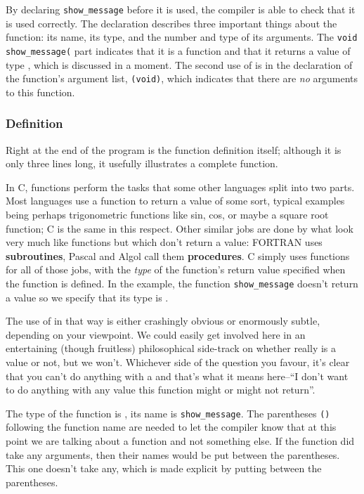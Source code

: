     By declaring \texttt{show\_message} before it is used, the compiler
     is able to check that it is used correctly. The declaration describes
     three important things about the function: its name, its type, and the
     number and type of its arguments. The \texttt{void show\_message(} part
     indicates that it is a function and that it returns a value of type
     \void, which is discussed in a moment. The second use of
     \void{} is in the declaration of the function's argument list,
     \texttt{(void)}, which indicates that there are \textit{no} arguments
     to this function.


   

   \subsubsection{Definition}
    

    Right at the end of the program is the function definition itself;
     although it is only three lines long, it usefully illustrates a complete
     function.


    In C, functions perform the tasks that some other languages split into
     two parts. Most languages use a function to return a value of some sort,
     typical examples being perhaps trigonometric functions like sin, cos, or
     maybe a square root function; C is the same in this respect. Other similar
     jobs are done by what look very much like functions but which don't return
     a value: FORTRAN uses \textbf{subroutines}, Pascal and Algol call them
     \textbf{procedures}. C simply uses functions for all of those jobs, with
     the \textit{type} of the function's return value specified when the
     function is defined. In the example, the function
     \texttt{show\_message} doesn't return a value so we specify that its
     type is \void.


    The use of \void{} in that way is either crashingly obvious or
     enormously subtle, depending on your viewpoint. We could easily get
     involved here in an entertaining (though fruitless) philosophical
     side-track on whether \void{} really is a value or not, but we
     won't. Whichever side of the question you favour, it's clear that you
     can't do anything with a \void{} and that's what it means
     here--``I don't want to do anything with any value this function
     might or might not return''.


    The type of the function is \void, its name is
     \texttt{show\_message}. The parentheses \texttt{()} following
     the function name are needed to let the compiler know that at this point
     we are talking about a function and not something else. If the function
     did take any arguments, then their names would be put between the
     parentheses. This one doesn't take any, which is made explicit by putting
     \void{} between the parentheses.


